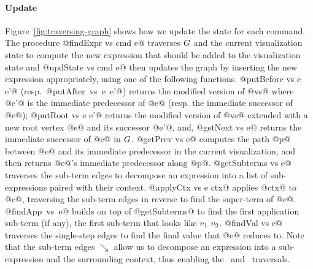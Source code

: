 \paragraph{Update}
Figure~\ref{fig:traversing-graph} shows how we update the state
for each command.
%
The procedure @findExpr vs cmd e@ traverses $G$
and the current visualization state to compute the new
expression that should be added to the visualization state
and @updState vs cmd e@ then updates the graph
by inserting the new expression appropriately, using one of
the following functions.
%
@putBefore vs e e'@ \hbox{(resp. @putAfter vs e e'@)}
returns the modified version of @vs@ where @e'@ is the
immediate predecessor of @e@ (resp. the immediate successor of @e@);
%
@putRoot vs e e'@ returns the modified version of @vs@ extended
with a new root vertex @e@ and its successor @e'@, and,
%
%
@getNext vs e@ returns the immediate successor of @e@ in $G$.
%
@getPrev vs e@ computes the path @p@ between @e@ and its immediate
predecessor in the current visualization, and then returns @e@'s immediate
predecessor along @p@.
%
@getSubterms vs e@ traverses the sub-term edges to decompose an
expression into a list of sub-expressions paired with their context.
%
@applyCtx vs e ctx@ applies @ctx@ to @e@, traversing the sub-term edges
in reverse to find the super-term of @e@.
%
\hbox{@findApp vs e@} builds on top of @getSubterms@ to find the first
application sub-term (if any), \ie the first sub-term that looks like
$v_1 \ v_2$.
%
@findVal vs e@ traverses the single-step edges to find the final value
that @e@ reduces to.
%
Note that the sub-term edges $\searrow$ allow us to decompose an
expression into a sub-expression and the surrounding context, thus
enabling the \stepintosym\ and \stepoversym\ traversals.


%
%
%
